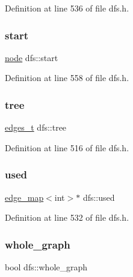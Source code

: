 Definition at line 536 of file dfs.\+h.

\mbox{\label{classdfs_af677cfc31fe06a18dd3a3aae7f7d112b}} 
\subsubsection{\texorpdfstring{start}{start}}
{\footnotesize\ttfamily \mbox{\hyperlink{classnode}{node}} dfs\+::start\hspace{0.3cm}{\ttfamily [protected]}}



Definition at line 558 of file dfs.\+h.

\mbox{\label{classdfs_aed496b618a937723bfec0b463e17e8d5}} 
\subsubsection{\texorpdfstring{tree}{tree}}
{\footnotesize\ttfamily \mbox{\hyperlink{edge_8h_a8f9587479bda6cf612c103494b3858e3}{edges\+\_\+t}} dfs\+::tree\hspace{0.3cm}{\ttfamily [protected]}}



Definition at line 516 of file dfs.\+h.

\mbox{\label{classdfs_afc18288747491be301d6d8d85d8f220b}} 
\subsubsection{\texorpdfstring{used}{used}}
{\footnotesize\ttfamily \mbox{\hyperlink{classedge__map}{edge\+\_\+map}}$<$int$>$$\ast$ dfs\+::used\hspace{0.3cm}{\ttfamily [protected]}}



Definition at line 532 of file dfs.\+h.

\mbox{\label{classdfs_ab8342c80ab208ef0e0d781f0769d0d95}} 
\subsubsection{\texorpdfstring{whole\+\_\+graph}{whole\_graph}}
{\footnotesize\ttfamily bool dfs\+::whole\+\_\+graph\hspace{0.3cm}{\ttfamily [protected]}}



